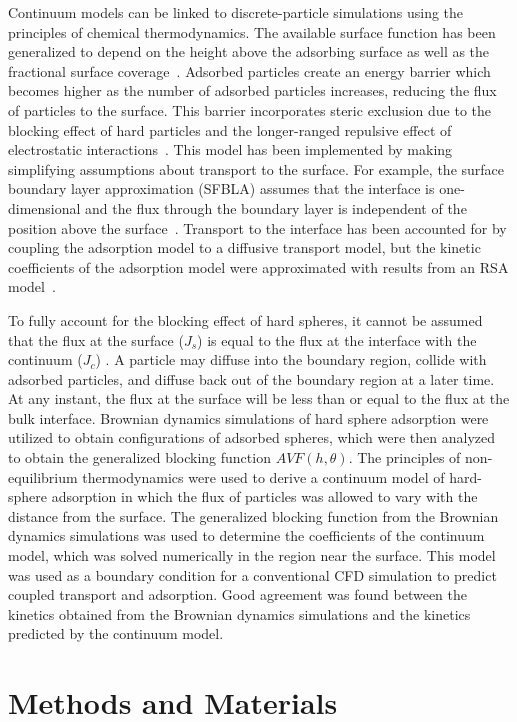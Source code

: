 Continuum models can be linked to discrete-particle simulations using
the principles of chemical thermodynamics. The available surface function
has been generalized to depend on the height above the adsorbing surface
as well as the fractional surface coverage~\cite{Adamczyk1999}.
Adsorbed particles create an energy barrier which becomes higher as
the number of adsorbed particles increases, reducing the flux of particles
to the surface. This barrier incorporates steric exclusion due to
the blocking effect of hard particles and the longer-ranged repulsive
effect of electrostatic interactions~\cite{Adamczyk2000}. This model
has been implemented by making simplifying assumptions about transport
to the surface. For example, the surface boundary layer approximation
(SFBLA) assumes that the interface is one-dimensional and the flux
through the boundary layer is independent of the position above the
surface~\cite{Adamczyk1999a}. Transport to the interface has been
accounted for by coupling the adsorption model to a diffusive transport
model, but the kinetic coefficients of the adsorption model were approximated
with results from an RSA model~\cite{Adamczyk2000}. 

To fully account for the blocking effect of hard spheres, it cannot
be assumed that the flux at the surface ($J_{s}$) is equal to the
flux at the interface with the continuum ($J_{c}$) . A particle may
diffuse into the boundary region, collide with adsorbed particles,
and diffuse back out of the boundary region at a later time. At any
instant, the flux at the surface will be less than or equal to the
flux at the bulk interface. Brownian dynamics simulations of hard
sphere adsorption were utilized to obtain configurations of adsorbed
spheres, which were then analyzed to obtain the generalized blocking
function $AVF\left(h,\theta\right)$. The principles of non-equilibrium
thermodynamics were used to derive a continuum model of hard-sphere
adsorption in which the flux of particles was allowed to vary with
the distance from the surface. The generalized blocking function from
the Brownian dynamics simulations was used to determine the coefficients
of the continuum model, which was solved numerically in the region
near the surface. This model was used as a boundary condition for
a conventional CFD simulation to predict coupled transport and adsorption.
Good agreement was found between the kinetics obtained from the Brownian
dynamics simulations and the kinetics predicted by the continuum model.


\section{Methods and Materials}



